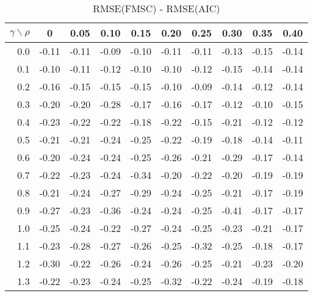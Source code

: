 \documentclass[12pt]{article}
\begin{document}
\begin{table}[!tbp]
\caption{RMSE(FMSC) - RMSE(AIC)}
 \begin{center}
 \begin{tabular}{r|rrrrrrrrr}\hline\hline
\multicolumn{1}{c|}{$\gamma\backslash\rho$}&\multicolumn{1}{c}{0}&\multicolumn{1}{c}{0.05}&\multicolumn{1}{c}{0.10}&\multicolumn{1}{c}{0.15}&\multicolumn{1}{c}{0.20}&\multicolumn{1}{c}{0.25}&\multicolumn{1}{c}{0.30}&\multicolumn{1}{c}{0.35}&\multicolumn{1}{c}{0.40}\tabularnewline
\hline

0.0&-0.11&-0.11&-0.09&-0.10&-0.11&-0.11&-0.13&-0.15&-0.14\tabularnewline
0.1&-0.10&-0.11&-0.12&-0.10&-0.10&-0.12&-0.15&-0.14&-0.14\tabularnewline
0.2&-0.16&-0.15&-0.15&-0.15&-0.10&-0.09&-0.14&-0.12&-0.14\tabularnewline
0.3&-0.20&-0.20&-0.28&-0.17&-0.16&-0.17&-0.12&-0.10&-0.15\tabularnewline
0.4&-0.23&-0.22&-0.22&-0.18&-0.22&-0.15&-0.21&-0.12&-0.12\tabularnewline
0.5&-0.21&-0.21&-0.24&-0.25&-0.22&-0.19&-0.18&-0.14&-0.11\tabularnewline
0.6&-0.20&-0.24&-0.24&-0.25&-0.26&-0.21&-0.29&-0.17&-0.14\tabularnewline
0.7&-0.22&-0.23&-0.24&-0.34&-0.20&-0.22&-0.20&-0.19&-0.19\tabularnewline
0.8&-0.21&-0.24&-0.27&-0.29&-0.24&-0.25&-0.21&-0.17&-0.19\tabularnewline
0.9&-0.27&-0.23&-0.36&-0.24&-0.24&-0.25&-0.41&-0.17&-0.17\tabularnewline
1.0&-0.25&-0.24&-0.22&-0.27&-0.24&-0.25&-0.23&-0.21&-0.17\tabularnewline
1.1&-0.23&-0.28&-0.27&-0.26&-0.25&-0.32&-0.25&-0.18&-0.17\tabularnewline
1.2&-0.30&-0.22&-0.26&-0.24&-0.26&-0.25&-0.21&-0.23&-0.20\tabularnewline
1.3&-0.22&-0.23&-0.24&-0.25&-0.32&-0.22&-0.24&-0.19&-0.18\tabularnewline
\hline
\end{tabular}

\end{center}

\end{table}

%
\end{document}
